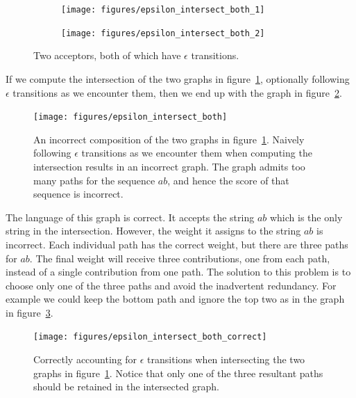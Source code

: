 \begin{figure}
    \centering
    \begin{subfigure}[b]{0.48\textwidth}
        \centering
        \texttt{[image: figures/epsilon\_intersect\_both\_1]}
    \end{subfigure}
    \begin{subfigure}[b]{0.48\textwidth}
        \centering
        \texttt{[image: figures/epsilon\_intersect\_both\_2]}
    \end{subfigure}
    \caption{Two acceptors, both of which have $\epsilon$ transitions.}
    \label{fig:epsilon_intersect_both_inputs}
\end{figure}

If we compute the intersection of the two graphs in
figure~\ref{fig:epsilon_intersect_both_inputs}, optionally following $\epsilon$
transitions as we encounter them, then we end up with the graph in
figure~\ref{fig:epsilon_intersect_both}.

\begin{figure}
    \centering
    \texttt{[image: figures/epsilon\_intersect\_both]}
    \caption{An incorrect composition of the two graphs in
    figure~\ref{fig:epsilon_intersect_both_inputs}. Naively following
    $\epsilon$ transitions as we encounter them when computing the intersection
    results in an incorrect graph. The graph admits too many paths for the
    sequence $ab$, and hence the score of that sequence is incorrect.}
    \label{fig:epsilon_intersect_both}
\end{figure}

The language of this graph is correct. It accepts the string $ab$ which is the
only string in the intersection. However, the weight it assigns to the string
$ab$ is incorrect. Each individual path has the correct weight, but there are
three paths for $ab$. The final weight will receive three contributions, one
from each path, instead of a single contribution from one path. The solution to
this problem is to choose only one of the three paths and avoid the inadvertent
redundancy. For example we could keep the bottom path and ignore the top two as
in the graph in figure~\ref{fig:epsilon_intersect_both_correct}.

\begin{figure}
    \centering
    \texttt{[image: figures/epsilon\_intersect\_both\_correct]}
    \caption{Correctly accounting for $\epsilon$ transitions when intersecting
    the two graphs in figure~\ref{fig:epsilon_intersect_both_inputs}. Notice
    that only one of the three resultant paths should be retained in the
    intersected graph.}
    \label{fig:epsilon_intersect_both_correct}
\end{figure}

